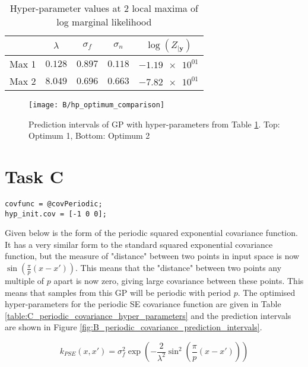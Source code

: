 \documentclass[11pt]{article}
\begin{document}
\begin{table}[h]
    \centering
    \small
    \begin{tabular}{|c|c|c|c|c|}
        \hline
         & $\lambda$ & $\sigma_f$ & $\sigma_n$ & $\log(Z_{|\textbf{y}})$ \\
        \hline
        Max 1 & $0.128$ & $0.897$ & $0.118$ & $\num{-1.19e+01}$ \\ 
        Max 2 & $8.049$ & $0.696$ & $0.663$ & $\num{-7.82e+01}$ \\ 
        \hline
    \end{tabular}
    \caption{Hyper-parameter values at 2 local maxima of log marginal likelihood}
    \label{table:B_hyper_parameter_optima}
\end{table}

\begin{figure}[h]
    \centering
    \texttt{[image: B/hp\_optimum\_comparison]}
    \caption{Prediction intervals of GP with hyper-parameters from Table \ref{table:B_hyper_parameter_optima}. Top: Optimum 1, Bottom: Optimum 2}
    \label{fig:B_hyper_parameter_optimum_comparison}
\end{figure}

\section{Task C}
\begin{lstlisting}[caption=Code to use periodic SE covariance. Training and prediction code same as Listing \ref{lst:A}, captionpos=b, basicstyle=\small, frame=tlrb]
covfunc = @covPeriodic;
hyp_init.cov = [-1 0 0];
\end{lstlisting}
\label{lst:C}

Given below is the form of the periodic squared exponential covariance function. It has a very similar form to the standard squared exponential covariance function, but the measure of "distance" between two points in input space is now $\sin(\frac{\pi}{p}(x-x'))$. This means that the "distance" between two points any multiple of $p$ apart is now zero, giving large covariance between these points. This means that samples from this GP will be periodic with period $p$. The optimised hyper-parameters for the periodic SE covariance function are given in Table \ref{table:C_periodic_covariance_hyper_parameters} and the prediction intervals are shown in Figure \ref{fig:B_periodic_covariance_prediction_intervals}.


\[k_{PSE}(x,x') = \sigma_f^2 \exp(-\frac{2}{\lambda^2}\sin^2(\frac{\pi}{p}(x-x')))\]
\end{document}
